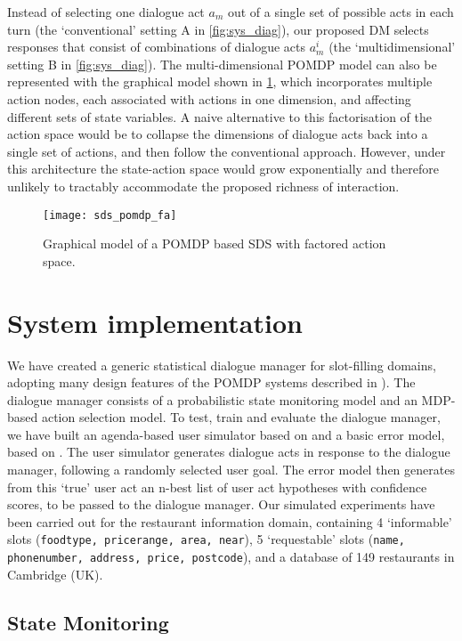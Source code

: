 \documentclass[11pt]{article}
\begin{document}
Instead of selecting one dialogue act $a_m$ out of a single set of possible acts in each turn (the `conventional' setting A in \cref{fig:sys_diag}), our proposed DM selects responses that consist of combinations of dialogue acts $a_m^i$ (the `multidimensional' setting B in \cref{fig:sys_diag}).  The multi-dimensional POMDP model can also be represented with the graphical model shown in \cref{fig:sds_pomdp_fa}, which incorporates multiple action nodes, each associated with actions in one dimension, and affecting different sets of state variables.  A naive alternative to this factorisation of the action space would be to collapse the dimensions of dialogue acts back into a single set of actions, and then follow the conventional approach.  However, under this architecture the state-action space would grow exponentially and therefore unlikely to tractably accommodate the proposed richness of interaction.
\begin{figure}[htb]
\centering
\texttt{[image: sds\_pomdp\_fa]}
\caption{Graphical model of a {POMDP} based SDS with factored action space.}
\label{fig:sds_pomdp_fa}
\end{figure}


\section{System implementation}\label{sec:sds-impl}

We have created a generic statistical dialogue manager for slot-filling domains, adopting many design features of the POMDP systems described in \cite{Young:2010vy,Thomson:2010dg}).  The dialogue manager consists of a probabilistic state monitoring model and an MDP-based action selection model.  To test, train and evaluate the dialogue manager, we have built an agenda-based user simulator based on \cite{Schatzmann:2007uc} and a basic error model, based on \cite{Thomson:2012wn}.  The user simulator generates dialogue acts in response to the dialogue manager, following a randomly selected user goal.  The error model then generates from this `true' user act an n-best list of user act hypotheses with confidence scores, to be passed to the dialogue manager.  Our simulated experiments have been carried out for the restaurant information domain, containing 4 `informable' slots ({\tt foodtype, pricerange, area, near}), 5 `requestable' slots ({\tt name, phonenumber, address, price, postcode}), and a database of 149 restaurants in Cambridge (UK).

\subsection{State Monitoring}
\end{document}
